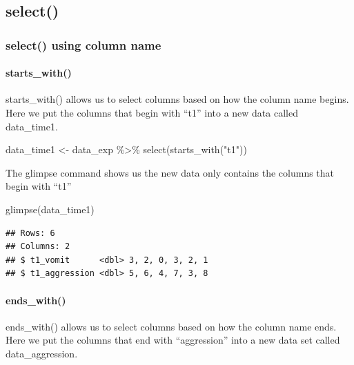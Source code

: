 \documentclass[
]{krantz}
\makeatletter
\newenvironment{Shaded}{\begin{snugshade}}{\end{snugshade}}
\newcommand{\FunctionTok}[1]{\textcolor[rgb]{0,0,0}{#1}}
\newcommand{\NormalTok}[1]{#1}
\newcommand{\OtherTok}[1]{\textcolor[rgb]{0.37,0.37,0.37}{#1}}
\newcommand{\SpecialCharTok}[1]{\textcolor[rgb]{0,0,0}{#1}}
\newcommand{\StringTok}[1]{\textcolor[rgb]{0.5,0.5,0.5}{#1}}
\newenvironment{kframe}{%
\medskip{}
\setlength{\fboxsep}{.8em}
 \def\at@end@of@kframe{}%
 \ifinner\ifhmode%
  \def\at@end@of@kframe{\end{minipage}}%
  \begin{minipage}{\columnwidth}%
 \fi\fi%
 \def\FrameCommand##1{\hskip\@totalleftmargin \hskip-\fboxsep
 \colorbox{shadecolor}{##1}\hskip-\fboxsep
     \hskip-\linewidth \hskip-\@totalleftmargin \hskip\columnwidth}%
 \MakeFramed {\advance\hsize-\width
   \@totalleftmargin\z@ \linewidth\hsize
   \@setminipage}}%
 {\par\unskip\endMakeFramed%
 \at@end@of@kframe}
\renewenvironment{Shaded}{\begin{kframe}}{\end{kframe}}
\makeatother
\begin{document}
\hypertarget{select-1}{%
\subsection{select()}\label{select-1}}

\hypertarget{select-using-column-name}{%
\subsubsection{select() using column name}\label{select-using-column-name}}

\hypertarget{starts_with}{%
\paragraph{starts\_with()}\label{starts_with}}

starts\_with() allows us to select columns based on how the column name begins. Here we put the columns that begin with ``t1'' into a new data called data\_time1.

\begin{Shaded}
\begin{Highlighting}[]
\NormalTok{data\_time1 }\OtherTok{\textless{}{-}}\NormalTok{ data\_exp }\SpecialCharTok{\%\textgreater{}\%} 
  \FunctionTok{select}\NormalTok{(}\FunctionTok{starts\_with}\NormalTok{(}\StringTok{"t1"}\NormalTok{))}
\end{Highlighting}
\end{Shaded}

The glimpse command shows us the new data only contains the columns that begin with ``t1''

\begin{Shaded}
\begin{Highlighting}[]
\FunctionTok{glimpse}\NormalTok{(data\_time1)}
\end{Highlighting}
\end{Shaded}

\begin{verbatim}
## Rows: 6
## Columns: 2
## $ t1_vomit      <dbl> 3, 2, 0, 3, 2, 1
## $ t1_aggression <dbl> 5, 6, 4, 7, 3, 8
\end{verbatim}

\hypertarget{ends_with}{%
\paragraph{ends\_with()}\label{ends_with}}

ends\_with() allows us to select columns based on how the column name ends. Here we put the columns that end with ``aggression'' into a new data set called data\_aggression.
\end{document}
